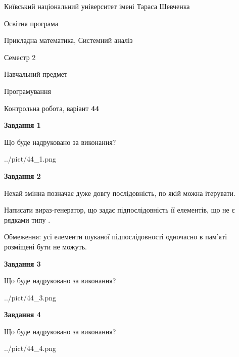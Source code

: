 \documentclass[12pt, ukrainian]{article}
\begin{document}
{{\begin {small}\par
{ \center  Київський національний університет імені Тараса Шевченка \par}
{\parbox {5 cm}{Освітня програма \hfill}{\parbox {8 cm}{Прикладна математика, Системний аналіз \hfill}}\parbox {5 cm}{\hfill Семестр 2}}\par
{\parbox {5 cm} {Навчальний предмет \hfill}\parbox {7 cm}{Програмування \hfill}\parbox {6cm}{\hfill}\par}\vspace{-7pt} \end{small}}{\center Контрольна робота, варіант  \No \textbf
{ 44 }\par}}
{
\begin {large}
{\begin {center}\textbf{Завдання 1}\end {center}}\par
Що буде надруковано за виконання?\par\par
\begin{center}
	{../pict/44_1.png}
\end{center}
\newpage

{\begin {center}\textbf{Завдання 2}\end {center}}\par
Нехай змінна  позначає дуже довгу послідовність, по якій можна ітерувати.

Написати вираз-генератор, що задає підпослідовність її елементів, що не є рядками типу .

Обмеження: усі елементи шуканої підпослідовності одночасно в пам'яті розміщені бути не можуть.\par
\newpage

{\begin {center}\textbf{Завдання 3}\end {center}}\par
Що буде надруковано за виконання?\par
\begin{center}
	{../pict/44_3.png}
\end{center}
\newpage

{\begin {center}\textbf{Завдання 4}\end {center}}\par
Що буде надруковано за виконання?\par
\begin{center}
	{../pict/44_4.png}
\end{center}
\newpage


\end{large}}
\end{document}
